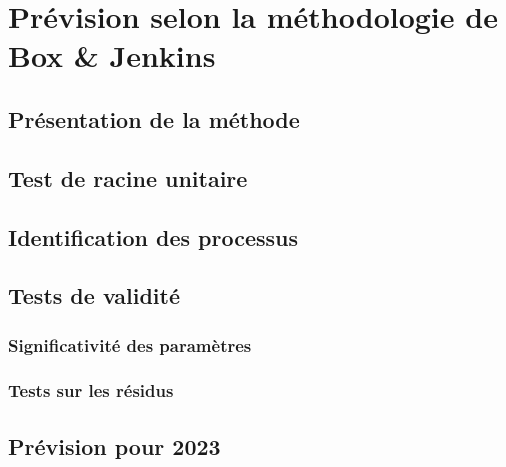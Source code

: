 \section{Prévision selon la méthodologie de Box \& Jenkins}
\subsection{Présentation de la méthode}
\subsection{Test de racine unitaire}
\subsection{Identification des processus}
\subsection{Tests de validité}
\subsubsection{Significativité des paramètres}
\subsubsection{Tests sur les résidus}
\subsection{Prévision pour 2023}
